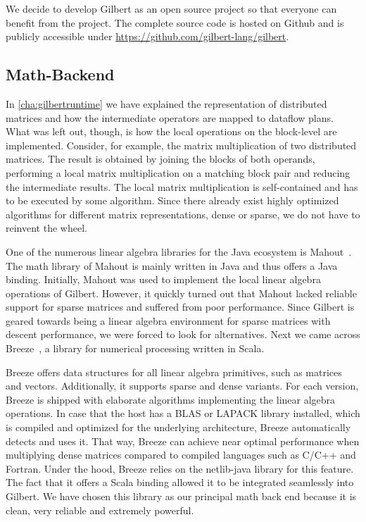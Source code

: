 We decide to develop Gilbert as an open source project so that everyone can benefit from the project.
The complete source code is hosted on Github and is publicly accessible under \url{https://github.com/gilbert-lang/gilbert}.

\subsection{Math-Backend}
\label{sec:mathBackend}

In \cref{cha:gilbertruntime} we have explained the representation of distributed matrices and how the intermediate operators are mapped to dataflow plans.
What was left out, though, is how the local operations on the block-level are implemented.
Consider, for example, the matrix multiplication of two distributed matrices.
The result is obtained by joining the blocks of both operands, performing a local matrix multiplication on a matching block pair and reducing the intermediate results.
The local matrix multiplication is self-contained and has to be executed by some algorithm.
Since there already exist highly optimized algorithms for different matrix representations, dense or sparse, we do not have to reinvent the wheel.

One of the numerous linear algebra libraries for the Java ecosystem is Mahout~\cite{mahout:2011a}.
The math library of Mahout is mainly written in Java and thus offers a Java binding.
Initially, Mahout was used to implement the local linear algebra operations of Gilbert.
However, it quickly turned out that Mahout lacked reliable support for sparse matrices and suffered from poor performance.
Since Gilbert is geared towards being a linear algebra environment for sparse matrices with descent performance, we were forced to look for alternatives.
Next we came across Breeze~\cite{breeze}, a library for numerical processing written in Scala.

Breeze offers data structures for all linear algebra primitives, such as matrices and vectors.
Additionally, it supports sparse and dense variants.
For each version, Breeze is shipped with elaborate algorithms implementing the linear algebra operations.
In case that the host has a BLAS or LAPACK library installed, which is compiled and optimized for the underlying architecture, Breeze automatically detects and uses it.
That way, Breeze can achieve near optimal performance when multiplying dense matrices compared to compiled languages such as C/C++ and Fortran.
Under the hood, Breeze relies on the netlib-java library for this feature.
The fact that it offers a Scala binding allowed it to be integrated seamlessly into Gilbert.
We have chosen this library as our principal math back end because it is clean, very reliable and extremely powerful.

